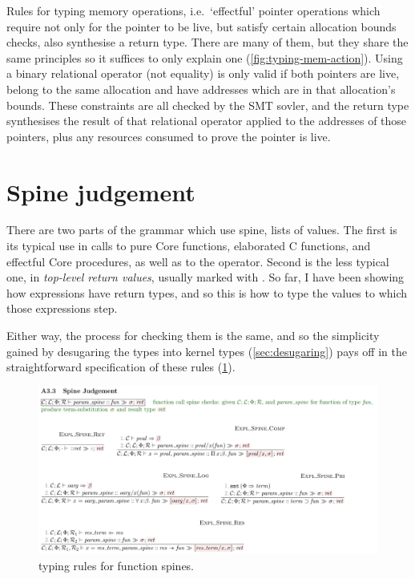 Rules for typing memory operations, i.e.\ `effectful' pointer operations which
require not only for the pointer to be live, but satisfy certain allocation
bounds checks, also synthesise a return type. There are many of them, but they
share the same principles so it suffices to only explain one
(\cref{fig:typing-mem-action}).
Using a binary relational operator (not equality) is only valid if both
pointers are live, belong to the same allocation and have addresses which are
in that allocation's bounds. These constraints are all checked by the SMT
sovler, and the return type synthesises the result of that relational operator
applied to the addresses of those pointers, plus any resources consumed to
prove the pointer is live.

\section{Spine judgement}

There are two parts of the grammar which use spine, lists of values. The first
is its typical use in calls to pure Core functions, elaborated C functions, and
effectful Core procedures, as well as to the  %
operator. Second is the less typical one, in \emph{top-level return values},
usually marked with . So far, I have been showing %
how expressions have return types, and so this is how to type the values to
which those expressions step.

Either way, the process for checking them is the same, and so the simplicity
gained by desugaring the  types into kernel types
(\cref{sec:desugaring}) pays off in the straightforward specification of these
rules (\cref{fig:typing-spine}).

\begin{figure}[tp]
    \includegraphics{figures/kernel-spine-typing}
    \caption{ typing rules for function
        spines.}\label{fig:typing-spine}
\end{figure}


